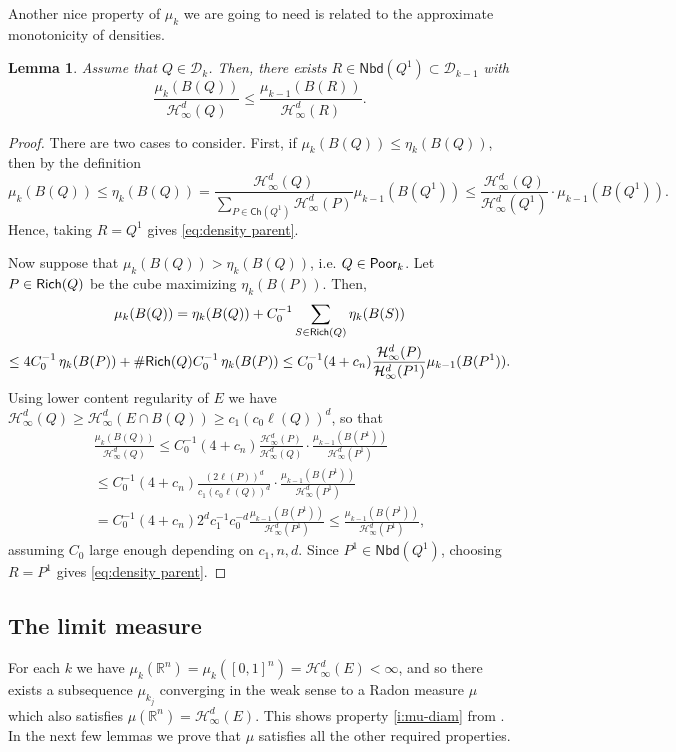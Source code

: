\documentclass[11pt,reqno]{amsart}
\newcommand{\fr}[2]{\frac{#1}{#2}}
\newtheorem{lemma}[theorem]{Lemma}
\theoremstyle{definition}
\theoremstyle{remark}
\numberwithin{equation}{section}
\newcommand{\R}{\mathbb{R}}
\newcommand{\hdc}{\mathcal{H}^d_\infty}
\newcommand{\dD}{\mathcal{D}}
\newcommand{\DD}{\mathcal{D}}
\newcommand{\dH}{\mathcal{H}}
\newcommand{\Child}{\mathsf{Ch}}
\newcommand{\Nei}{\mathsf{Nbd}}
\theoremstyle{theorem}
\theoremstyle{definition}
\theoremstyle{remark}
\numberwithin{equation}{section}
\begin{document}
Another nice property of $\mu_k$ we are going to need is related to the approximate monotonicity of densities.
\begin{lemma}\label{lem:density parent}
	Assume that $Q\in\dD_k$. Then, there exists $R\in\Nei(Q^1)\subset\DD_{k-1}$ with
	\begin{equation}\label{eq:density parent}
	\frac{\mu_k(B(Q))}{\dH^d_\infty(Q)}\le \frac{\mu_{k-1}(B(R))}{\dH^d_\infty(R)}.
	\end{equation}
\end{lemma}
\begin{proof}
	There are two cases to consider. First, if $\mu_k(B(Q))\le \eta_k(B(Q))$, then by the definition
	\begin{equation*}
	\mu_k(B(Q)) \leq \eta_k(B(Q)) = \frac{\mathcal{H}^{d}_{\infty}(Q)}{\sum_{P \in \Child(Q^1)} \mathcal{H}^{d}_{\infty}(P)} \mu_{k-1}(B(Q^1)) \leq \frac{\mathcal{H}^{d}_{\infty}(Q)}{\mathcal{H}^{d}_{\infty}(Q^1)} \cdot \mu_{k-1}(B(Q^1)).
	\end{equation*}
	Hence, taking $R=Q^1$ gives \eqref{eq:density parent}.
	
	Now suppose that $\mu_k(B(Q))> \eta_k(B(Q))$, i.e. $Q\in\mathsf{Poor}_k$. Let $P\in\mathsf{Rich}(Q)$ be the cube maximizing $\eta_{k}(B(P))$. Then,
	\begin{multline*}
	\mu_k(B(Q)) = \eta_{k}(B(Q)) + C_0^{-1}\sum_{S\in\Rich(Q)}\eta_{k}(B(S))\\
	\le 4C_0^{-1}\,\eta_{k}(B(P)) + \#\Rich(Q)C_0^{-1}\,\eta_{k}(B(P)) \le C_0^{-1}(4+c_n) \fr{\hdc(P)}{\hdc(P^1)}\mu_{k-1}(B(P^1)).
	\end{multline*}	
	Using lower content regularity of $E$ we have $\hdc(Q)\ge \hdc(E\cap B(Q))\ge c_1 (c_0\ell(Q))^d$, so that
	\begin{multline*}
	\fr{\mu_k(B(Q))}{\hdc(Q)}\le C_0^{-1}(4+c_n)\fr{\hdc(P)}{\hdc{(Q)}}\cdot \fr{\mu_{k-1}(B(P^1))}{\hdc(P^1)}\\
	\le C_0^{-1}(4+c_n)\fr{(2\ell(P))^d}{c_1 (c_0\ell(Q))^d}\cdot \fr{\mu_{k-1}(B(P^1))}{\hdc(P^1)}\\
	 = C_0^{-1}(4+c_n)2^d c_1^{-1}c_0^{-d}\fr{\mu_{k-1}(B(P^1))}{\hdc(P^1)}\le \fr{\mu_{k-1}(B(P^1))}{\hdc(P^1)},
	\end{multline*}
	assuming $C_0$ large enough depending on $c_1,n,d$. Since $P^1\in\Nei(Q^1)$, choosing $R=P^1$ gives \eqref{eq:density parent}.
\end{proof}

\subsection{The limit measure}
For each $k$ we have $\mu_k(\R^n) = \mu_k([0,1]^n)= \hdc(E)< \infty$, and so there exists a subsequence $\mu_{k_j}$ converging in the weak sense to a Radon measure $\mu$ which also satisfies $\mu(\R^n) = \hdc(E)$. This shows property \eqref{i:mu-diam} from . In the next few lemmas we prove that $\mu$ satisfies all the other required properties.
\end{document}
